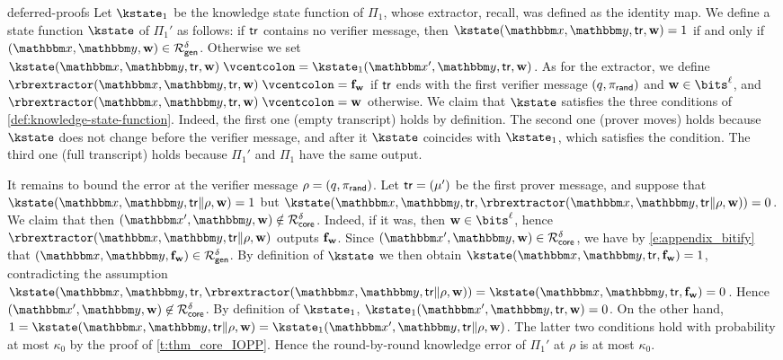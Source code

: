 \begin{lncsappendix}{deferred-proofs}
Let $\kstate_1$ be the knowledge state function of $\Pi_1$, whose extractor, recall, was defined as the identity map. We define a state function $\kstate$ of $\Pi_1'$ as follows: if $\mathsf{tr}$ contains no verifier message, then $\kstate(\inp,\lncsbreak\oracle,\lncsbreak\tr,\ww)=1$ if and only if $(\inp,\oracle,\ww)\in \Relation_{\mathsf{gen}}^{\delta}$. Otherwise we set $\kstate(\inp,\lncsbreak\oracle,\lncsbreak\tr,\ww)\defeq \kstate_1(\inp',\oracle,\tr,\ww)$. As for the extractor, we define $\rbrextractor(\inp,\lncsbreak\oracle,\lncsbreak\tr,\ww)\defeq \bff_{\ww}$ if $\mathsf{tr}$ ends with the first verifier message $(q,\pi_{\mathsf{rand}})$ and $\ww\in \bits^{\codedim}$, and $\rbrextractor(\inp,\lncsbreak\oracle,\lncsbreak\tr,\ww)\defeq \ww$ otherwise. We claim that $\kstate$ satisfies the three conditions of \cref{def:knowledge-state-function}. Indeed, the first one (empty transcript) holds by definition. The second one (prover moves) holds because $\kstate$ does not change before the verifier message, and after it $\kstate$ coincides with $\kstate_1$, which satisfies the condition. The third one (full transcript) holds because $\Pi_1'$ and $\Pi_1$ have the same output.



It remains to bound the error at the verifier message $\rho=(q,\pi_{\mathsf{rand}})$. Let $\mathsf{tr}=(\mu')$ be the first prover message, and suppose that $\kstate(\inp,\lncsbreak\oracle,\lncsbreak\tr\Vert\rho,\ww)=1$ but $\kstate(\inp,\lncsbreak\oracle,\lncsbreak\tr,\rbrextractor(\inp,\lncsbreak\oracle,\lncsbreak\tr\Vert\rho,\ww))=0$. We claim that then $(\inp',\oracle,\ww)\notin\Relation_{\mathsf{core}}^{\delta}$. Indeed, if it was, then $\ww\in\bits^{\codedim}$, hence  $\rbrextractor(\inp,\lncsbreak\oracle,\lncsbreak\tr\Vert\rho,\ww)$ outputs $\mathbf{f}_{\mathbf{w}}$. Since   $(\inp',\oracle,\ww) \in \Relation_{\mathsf{core}}^{\delta}$, we have by \eqref{e:appendix_bitify}  that $(\inp,\oracle,\bff_\ww) \in \Relation_{\mathsf{gen}}^{\delta}$. By definition of $\kstate$ we then obtain  $\kstate(\inp,\lncsbreak\oracle,\lncsbreak\tr,\bff_{\ww})=1$, contradicting the assumption $\kstate(\inp,\lncsbreak\oracle,\lncsbreak\tr,\rbrextractor(\inp,\lncsbreak\oracle,\lncsbreak\tr\Vert\rho,\ww))=\kstate(\inp,\lncsbreak\oracle,\lncsbreak\tr,\bff_{\ww})=0$. Hence $(\inp',\oracle,\ww)\not\in\Relation_{\mathsf{core}}^{\delta}$. By  definition of $\kstate_1$, $\kstate_1(\inp',\oracle,\tr,\ww)=0$. On the other hand, $1=\kstate(\inp,\lncsbreak\oracle,\lncsbreak\tr\Vert\rho,\ww)=\kstate_1(\inp',\oracle,\tr\Vert\rho,\ww)$. The latter two conditions hold with probability at most $\kappa_0$ by the proof of \cref{t:thm_core_IOPP}. Hence the round-by-round knowledge error of $\Pi_1'$ at $\rho$ is at most $\kappa_0$.


\end{lncsappendix}
